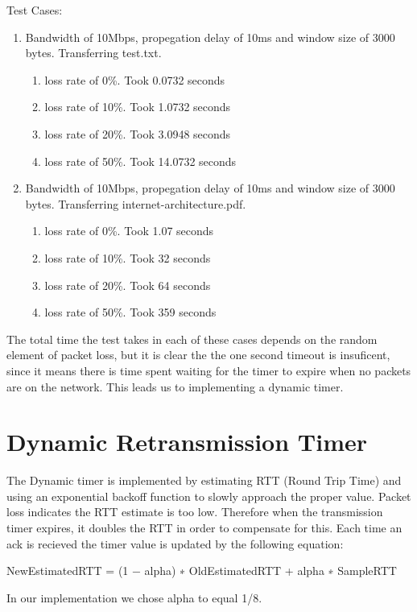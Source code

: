 \documentclass[11pt]{article}
\begin{document}
Test Cases:
\begin{enumerate}
\item Bandwidth of 10Mbps, propegation delay of 10ms and window size of 3000 bytes. Transferring test.txt.
\begin{enumerate}
\item loss rate of 0\%. Took 0.0732 seconds
\item loss rate of 10\%. Took 1.0732 seconds
\item loss rate of 20\%. Took 3.0948 seconds
\item loss rate of 50\%. Took 14.0732 seconds
\end{enumerate}

\item Bandwidth of 10Mbps, propegation delay of 10ms and window size of 3000 bytes. Transferring internet-architecture.pdf.
\begin{enumerate}
\item loss rate of 0\%. Took 1.07 seconds
\item loss rate of 10\%. Took 32 seconds
\item loss rate of 20\%. Took 64 seconds
\item loss rate of 50\%. Took 359 seconds
\end{enumerate}

\end{enumerate}

The total time the test takes in each of these cases depends on the random element of packet loss, but it is clear the the one second timeout is insuficent, since it means there is time spent waiting for the timer to expire when no packets are on the network. This leads us to implementing a dynamic timer.

\section{Dynamic Retransmission Timer}

The Dynamic timer is implemented by estimating RTT (Round Trip Time) and using an exponential backoff function to slowly approach the proper value. Packet loss indicates the RTT estimate is too low. Therefore when the transmission timer expires, it doubles the RTT in order to compensate for this. 
Each time an ack is recieved the timer value is updated by the following equation:

NewEstimatedRTT = (1 − alpha) ∗ OldEstimatedRTT + alpha ∗ SampleRTT 

In our implementation we chose alpha to equal 1/8. 
\end{document}
